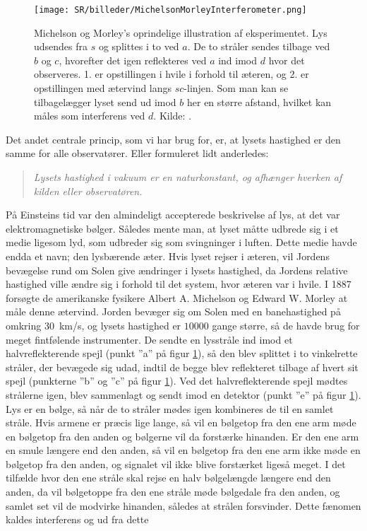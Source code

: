 \begin{figure}
    \centering
    \texttt{[image: SR/billeder/MichelsonMorleyInterferometer.png]}
    \caption{Michelson og Morley's oprindelige illustration af eksperimentet. Lys udsendes fra $s$ og splittes i to ved $a$. De to stråler sendes tilbage ved $b$ og $c$, hvorefter det igen reflekteres ved $a$ ind imod $d$ hvor det observeres. 1. er opstillingen i hvile i forhold til æteren, og 2. er opstillingen med ætervind langs $sc$-linjen. Som man kan se tilbagelægger lyset send ud imod $b$ her en større afstand, hvilket kan måles som interferens ved $d$. Kilde: \cite{michelsonRelativeMotionEarth1887}.}
    \label{fig:SR:MM}
\end{figure}
%
Det andet centrale princip, som vi har brug for, er, at lysets hastighed er den samme for alle observatører. Eller formuleret lidt anderledes:
\begin{quote}
{\em Lysets hastighed i vakuum er en naturkonstant, og afhænger hverken af kilden eller observatøren.}
\end{quote}
På Einsteins tid var den almindeligt accepterede beskrivelse af lys, at det var elektromagnetiske bølger.
Således mente man, at lyset måtte udbrede sig i et medie ligesom lyd, som udbreder sig som svingninger i luften.
Dette medie havde endda et navn; den lysbærende æter.
Hvis lyset rejser i æteren, vil Jordens bevægelse rund om Solen give ændringer i lysets hastighed, da Jordens relative hastighed ville ændre sig i forhold til det system, hvor æteren var i hvile.
I 1887 forsøgte de amerikanske fysikere Albert A. Michelson og Edward W. Morley at måle denne ætervind. Jorden bevæger sig om Solen med en banehastighed på omkring \SI{30}{km/s}, og lysets hastighed er $\num{10000}$ gange større, så de havde brug for meget fintfølende instrumenter. De sendte en lysstråle ind imod et halvreflekterende spejl (punkt ''a'' på figur \ref{fig:SR:MM}), så den blev splittet i to vinkelrette stråler, der bevægede sig udad, indtil de begge blev reflekteret tilbage af hvert sit spejl (punkterne ''b'' og ''c'' på figur \ref{fig:SR:MM}). Ved det halvreflekterende spejl mødtes strålerne igen, blev sammenlagt og sendt imod en detektor (punkt ''e'' på figur \ref{fig:SR:MM}). Lys er en bølge, så når de to stråler mødes igen kombineres de til en samlet stråle. Hvis armene er præcis lige lange, så vil en bølgetop fra den ene arm møde en bølgetop fra den anden og bølgerne vil da forstærke hinanden. Er den ene arm en smule længere end den anden, så vil en bølgetop fra den ene arm ikke møde en bølgetop fra den anden, og signalet vil ikke blive forstærket ligeså meget. I det tilfælde hvor den ene stråle skal rejse en halv bølgelængde længere end den anden, da vil bølgetoppe fra den ene stråle møde bølgedale fra den anden, og samlet set vil de modvirke hinanden, således at strålen forsvinder. Dette fænomen kaldes interferens og ud fra dette %
